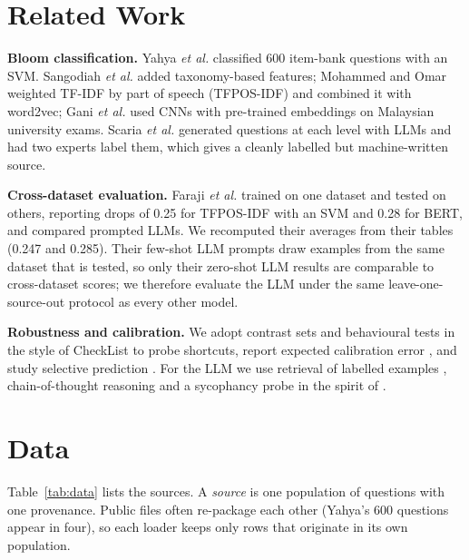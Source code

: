 \documentclass[conference]{IEEEtran}
\begin{document}
\section{Related Work}

\textbf{Bloom classification.} Yahya \emph{et al.} \cite{yahya2012} classified 600 item-bank
questions with an SVM. Sangodiah \emph{et al.} \cite{sangodiah2017} added taxonomy-based features;
Mohammed and Omar \cite{mohammed2020} weighted TF-IDF by part of speech (TFPOS-IDF) and combined it
with word2vec; Gani \emph{et al.} \cite{gani2023} used CNNs with pre-trained embeddings on Malaysian
university exams. Scaria \emph{et al.} \cite{scaria2024} generated questions at each level with LLMs
and had two experts label them, which gives a cleanly labelled but machine-written source.

\textbf{Cross-dataset evaluation.} Faraji \emph{et al.} \cite{faraji2026} trained on one dataset
and tested on others, reporting drops of 0.25 for TFPOS-IDF with an SVM and 0.28 for BERT, and
compared prompted LLMs. We recomputed their averages from their tables (0.247 and 0.285). Their
few-shot LLM prompts draw examples from the same dataset that is tested, so only their zero-shot
LLM results are comparable to cross-dataset scores; we therefore evaluate the LLM under the same
leave-one-source-out protocol as every other model.

\textbf{Robustness and calibration.} We adopt contrast sets \cite{gardner2020} and behavioural
tests in the style of CheckList \cite{ribeiro2020} to probe shortcuts, report expected
calibration error \cite{guo2017}, and study selective prediction \cite{geifman2017}. For the LLM
we use retrieval of labelled examples \cite{lewis2020}, chain-of-thought reasoning
\cite{wei2022} and a sycophancy probe in the spirit of \cite{sharma2024}.

\section{Data}\label{sec:data}

Table~\ref{tab:data} lists the sources. A \emph{source} is one population of questions with one
provenance. Public files often re-package each other (Yahya's 600 questions appear in four), so
each loader keeps only rows that originate in its own population.
\end{document}
